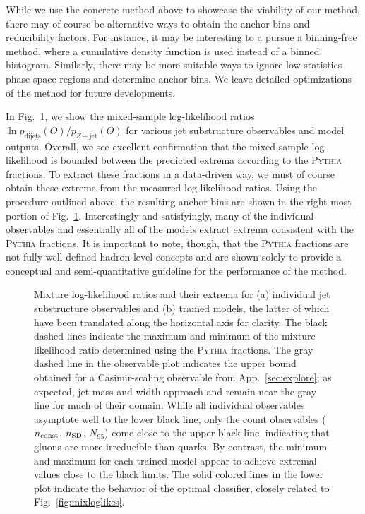 \documentclass[letterpaper,11pt]{article}
\DeclareRobustCommand{\App}[1]{App.~\ref{#1}}
\DeclareRobustCommand{\Fig}[1]{Fig.~\ref{#1}}
\newcommand{\pythia}{\textsc{Pythia}\xspace}
\begin{document}
While we use the concrete method above to showcase the viability of our method, there may of course be alternative ways to obtain the anchor bins and reducibility factors.
%
For instance, it may be interesting to a pursue a binning-free method, where a cumulative density function is used instead of a binned histogram.
%
Similarly, there may be more suitable ways to ignore low-statistics phase space regions and determine anchor bins.
%
We leave detailed optimizations of the method for future developments.

In \Fig{fig:histratios}, we show the mixed-sample log-likelihood ratios $\ln p_\text{dijets}(O)/p_\text{$Z+$jet}(O)$ for various jet substructure observables and model outputs.
%
Overall, we see excellent confirmation that the mixed-sample log likelihood is bounded between the predicted extrema according to the \pythia fractions.
%
To extract these fractions in a data-driven way, we must of course obtain these extrema from the measured log-likelihood ratios.
%
Using the procedure outlined above, the resulting anchor bins are shown in the right-most portion of \Fig{fig:histratios}.
%
Interestingly and satisfyingly, many of the individual observables and essentially all of the models extract extrema consistent with the \pythia fractions.
%
It is important to note, though, that the \pythia fractions are not fully well-defined hadron-level concepts and are shown solely to provide a conceptual and semi-quantitative guideline for the performance of the method.


\begin{figure}[t]
\centering
{}

\caption{
%
Mixture log-likelihood ratios and their extrema for (a) individual jet substructure observables and (b) trained models, the latter of which have been translated along the horizontal axis for clarity. 
%
The black dashed lines indicate the maximum and minimum of the mixture likelihood ratio determined using the \pythia fractions.
%
The gray dashed line in the observable plot indicates the upper bound obtained for a Casimir-scaling observable from \App{sec:explore}; as expected, jet mass and width approach and remain near the gray line for much of their domain.
%
While all individual observables asymptote well to the lower black line, only the count observables ($n_{\rm const}$, $n_{\rm SD}$, $N_{95}$) come close to the upper black line, indicating that gluons are more irreducible than quarks.
%
By contrast, the minimum and maximum for each trained model appear to achieve extremal values close to the black limits.
%
The solid colored lines in the lower plot indicate the behavior of the optimal classifier, closely related to \Fig{fig:mixloglikes}.
}
\label{fig:histratios}
\end{figure}
\afterpage{\clearpage}
\end{document}
